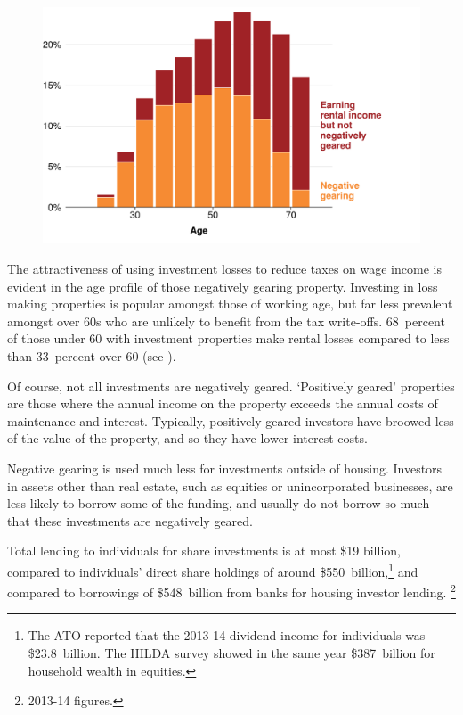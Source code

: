 \documentclass{grattan}\usepackage[]{graphicx}\usepackage[]{color}
\begin{document}
\begin{figure}[!htb]

\includegraphics[width=1.225\columnwidth]{CGT-NG-atlas//NG-PG-by-age-1}

\end{figure}

The attractiveness of using investment losses to reduce taxes on wage
income is evident in the age profile of those negatively gearing
property. Investing in loss making properties is popular amongst those
of working age, but far less prevalent amongst over 60s who are unlikely
to benefit from the tax write-offs. 68~percent of those under 60
with investment properties make rental losses compared to less than 33~percent over 60 (see ).

Of course, not all investments are negatively geared. `Positively geared' properties are those where the annual income on the property exceeds the annual costs of maintenance and interest. Typically, positively-geared investors have broowed less of the value of the property, and so they have lower interest costs.

Negative gearing is used much less for investments outside of housing. Investors in assets other than real estate, such as equities or unincorporated businesses, are less likely to borrow some of the funding, and usually do not borrow so much that these investments are negatively geared. 

Total lending to individuals for share investments is at most \$19 billion, compared to individuals' direct share holdings of around \$550~billion,\footnote{The ATO reported that the 2013-14 dividend income for individuals was \$23.8~billion. The HILDA survey showed in the same year \$387~billion for household wealth in equities.}  and compared to borrowings of \$548~billion from banks for housing investor lending.%
  \footnote{2013-14 figures.}
\end{document}
